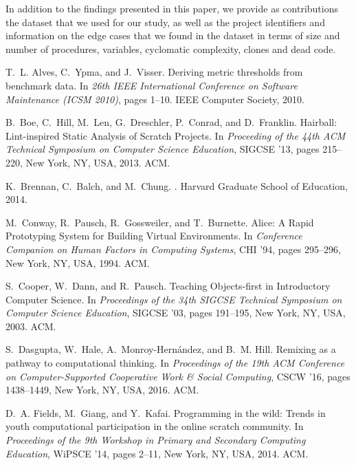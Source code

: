 \documentclass{sig-alternate-05-2015}
\begin{document}
In addition to the findings presented in this paper, we provide as contributions the dataset that we used for our study, as well as the project identifiers and information on the edge cases that we found in the dataset in terms of size and number of procedures, variables, cyclomatic complexity, clones and dead code.\footnotemark[\ref{repo}]

\begin{thebibliography}{10}
	
	T.~L. Alves, C.~Ypma, and J.~Visser.
	\newblock Deriving metric thresholds from benchmark data.
	\newblock In {\em 26th {IEEE} {International} {Conference} on {Software}
		{Maintenance} ({ICSM} 2010)}, pages 1--10. IEEE Computer Society, 2010.
	
	B.~Boe, C.~Hill, M.~Len, G.~Dreschler, P.~Conrad, and D.~Franklin.
	\newblock Hairball: {Lint}-inspired {Static} {Analysis} of {Scratch}
	{Projects}.
	\newblock In {\em Proceeding of the 44th {ACM} {Technical} {Symposium} on
		{Computer} {Science} {Education}}, {SIGCSE} '13, pages 215--220, New York,
	NY, USA, 2013. ACM.
	
	K.~Brennan, C.~Balch, and M.~Chung.
	.
	\newblock Harvard Graduate School of Education, 2014.
	
	M.~Conway, R.~Pausch, R.~Gossweiler, and T.~Burnette.
	\newblock Alice: {A} {Rapid} {Prototyping} {System} for {Building} {Virtual}
	{Environments}.
	\newblock In {\em Conference {Companion} on {Human} {Factors} in {Computing}
		{Systems}}, {CHI} '94, pages 295--296, New York, NY, USA, 1994. ACM.
	
	S.~Cooper, W.~Dann, and R.~Pausch.
	\newblock Teaching {Objects}-first in {Introductory} {Computer} {Science}.
	\newblock In {\em Proceedings of the 34th {SIGCSE} {Technical} {Symposium} on
		{Computer} {Science} {Education}}, {SIGCSE} '03, pages 191--195, New York,
	NY, USA, 2003. ACM.
	
	S.~Dasgupta, W.~Hale, A.~Monroy-Hern\'{a}ndez, and B.~M. Hill.
	\newblock Remixing as a pathway to computational thinking.
	\newblock In {\em Proceedings of the 19th ACM Conference on Computer-Supported
		Cooperative Work \& Social Computing}, CSCW '16, pages 1438--1449, New York,
	NY, USA, 2016. ACM.
	
	D.~A. Fields, M.~Giang, and Y.~Kafai.
	\newblock Programming in the wild: Trends in youth computational participation
	in the online scratch community.
	\newblock In {\em Proceedings of the 9th Workshop in Primary and Secondary
		Computing Education}, WiPSCE '14, pages 2--11, New York, NY, USA, 2014. ACM.
	

\end{thebibliography}
\end{document}
